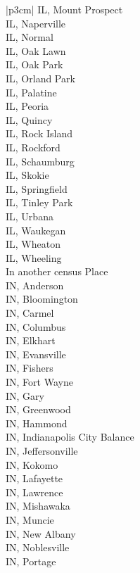 \begin{customLongTable}{ |p{3cm}| }
IL, Mount Prospect \\ \hline
IL, Naperville \\ \hline
IL, Normal \\ \hline
IL, Oak Lawn \\ \hline
IL, Oak Park \\ \hline
IL, Orland Park \\ \hline
IL, Palatine \\ \hline
IL, Peoria \\ \hline
IL, Quincy \\ \hline
IL, Rock Island \\ \hline
IL, Rockford \\ \hline
IL, Schaumburg \\ \hline
IL, Skokie \\ \hline
IL, Springfield \\ \hline
IL, Tinley Park \\ \hline
IL, Urbana \\ \hline
IL, Waukegan \\ \hline
IL, Wheaton \\ \hline
IL, Wheeling \\ \hline
In another census Place \\ \hline
IN, Anderson \\ \hline
IN, Bloomington \\ \hline
IN, Carmel \\ \hline
IN, Columbus \\ \hline
IN, Elkhart \\ \hline
IN, Evansville \\ \hline
IN, Fishers \\ \hline
IN, Fort Wayne \\ \hline
IN, Gary \\ \hline
IN, Greenwood \\ \hline
IN, Hammond \\ \hline
IN, Indianapolis City Balance \\ \hline
IN, Jeffersonville \\ \hline
IN, Kokomo \\ \hline
IN, Lafayette \\ \hline
IN, Lawrence \\ \hline
IN, Mishawaka \\ \hline
IN, Muncie \\ \hline
IN, New Albany \\ \hline
IN, Noblesville \\ \hline
IN, Portage \\ \hline

\end{customLongTable}
